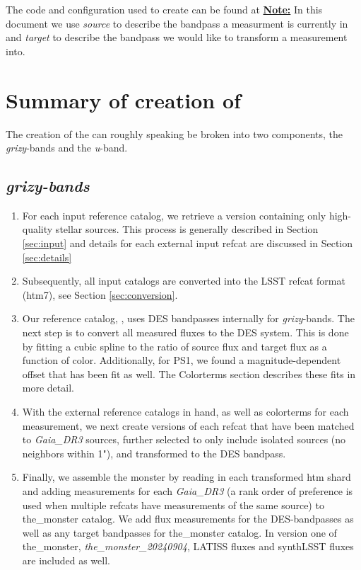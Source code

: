 The code and configuration used to create \monster can be found at \href{https://github.com/lsst-dm/the_monster}
\textbf{Note:} In this document we use \emph{source} to describe the bandpass a measurment is currently in and \emph{target} to describe the bandpass we would like to transform a measurement into. 

\section{Summary of creation of \monster}
The creation of the \monster can roughly speaking be broken into two components, the \textit{grizy}-bands and the \textit{u}-band. 


\subsection{\textit{grizy-bands}}
\begin{enumerate}
    \item For each input reference catalog, we retrieve a version containing only high-quality stellar sources. This process is generally described in Section \ref{sec:input} and details for each external input refcat are discussed in Section \ref{sec:details}
    \item Subsequently, all input catalogs are converted into the LSST refcat format (htm7), see Section \ref{sec:conversion}.
    \item Our reference catalog, \monster, uses DES bandpasses internally for \textit{grizy}-bands. The next step is to convert all measured fluxes to the DES system. This is done by fitting a cubic spline to the ratio of source flux and target flux as a function of color. Additionally, for PS1, we found a magnitude-dependent offset that has been fit as well. The Colorterms section describes these fits in more detail.
    \item With the external reference catalogs in hand, as well as colorterms for each measurement, we next create versions of each refcat that have been matched to \textit{Gaia\_DR3} sources, further selected to only include isolated sources (no neighbors within 1"), and transformed to the DES bandpass.
    \item Finally, we assemble the monster by reading in each transformed htm shard and adding measurements for each \textit{Gaia\_DR3} (a rank order of preference is used when multiple refcats have measurements of the same source) to the\_monster catalog. We add flux measurements for the DES-bandpasses as well as any target bandpasses for the\_monster catalog. In version one of the\_monster, \textit{the\_monster\_20240904}, LATISS fluxes and synthLSST fluxes are included as well.
\end{enumerate}

